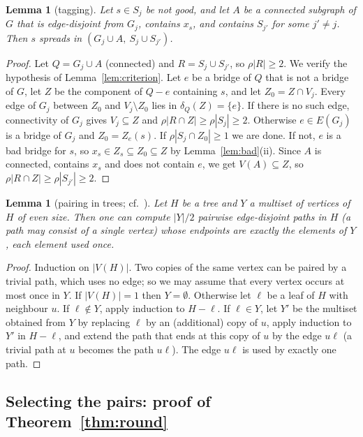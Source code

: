 \documentclass[11pt,letterpaper]{article}
\newtheorem{lemma}[theorem]{Lemma}
\theoremstyle{definition}
\begin{document}
\begin{lemma}[tagging]\label{lem:tag}
Let $s\in S_j$ be not good, and let $A$ be a connected subgraph of $G$ that is edge-disjoint
from $G_j$, contains $x_s$, and contains $S_{j'}$ for some $j'\ne j$. Then $s$ spreads in
$(G_j\cup A,\ S_j\cup S_{j'})$.
\end{lemma}
\begin{proof}
Let $Q=G_j\cup A$ (connected) and $R=S_j\cup S_{j'}$, so $\rho|R|\ge2$. We verify the
hypothesis of Lemma~\ref{lem:criterion}. Let $e$ be a bridge of $Q$ that is not a bridge of
$G$, let $Z$ be the component of $Q-e$ containing $s$, and let $Z_0=Z\cap V_j$. Every edge of
$G_j$ between $Z_0$ and $V_j\setminus Z_0$ lies in $\delta_Q(Z)=\{e\}$. If there is no such
edge, connectivity of $G_j$ gives $V_j\subseteq Z$ and $\rho|R\cap Z|\ge\rho|S_j|\ge2$.
Otherwise $e\in E(G_j)$ is a bridge of $G_j$ and $Z_0=Z_e(s)$. If
$\rho|S_j\cap Z_0|\ge1$ we are done. If not, $e$ is a bad bridge for $s$, so
$x_s\in Z_s\subseteq Z_0\subseteq Z$ by Lemma~\ref{lem:bad}(ii). Since $A$ is connected,
contains $x_s$ and does not contain $e$, we get $V(A)\subseteq Z$, so
$\rho|R\cap Z|\ge\rho|S_{j'}|\ge2$.
\end{proof}

\begin{lemma}[pairing in trees; cf.~{\cite[Lemma~3.14]{CKS13}}]\label{lem:pairing}
Let $H$ be a tree and $Y$ a multiset of vertices of $H$ of even size. Then one can compute
$|Y|/2$ pairwise edge-disjoint paths in $H$ (a path may consist of a single vertex) whose
endpoints are exactly the elements of $Y$, each element used once.
\end{lemma}
\begin{proof}
Induction on $|V(H)|$. Two copies of the same vertex can be paired by a trivial path, which
uses no edge; so we may assume that every vertex occurs at most once in $Y$. If $|V(H)|=1$
then $Y=\emptyset$. Otherwise let $\ell$ be a leaf of $H$ with neighbour $u$. If
$\ell\notin Y$, apply induction to $H-\ell$. If $\ell\in Y$, let $Y'$ be the multiset obtained
from $Y$ by replacing $\ell$ by an (additional) copy of $u$, apply induction to $Y'$ in
$H-\ell$, and extend the path that ends at this copy of $u$ by the edge $u\ell$ (a trivial path
at $u$ becomes the path $u\ell$). The edge $u\ell$ is used by exactly one path.
\end{proof}

\subsection{Selecting the pairs: proof of Theorem~\ref{thm:round}}\label{sec:selection}
\end{document}
